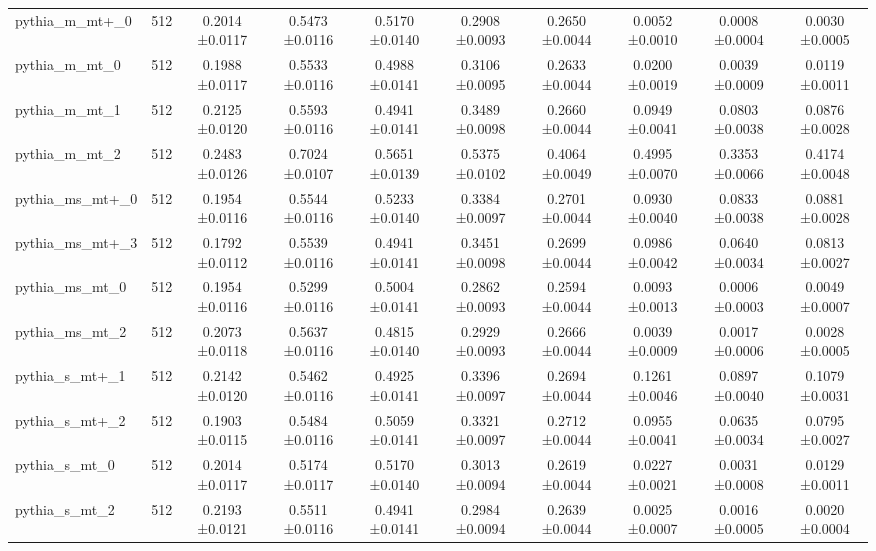 \begin{tabular}{lccccccccc}
pythia\_m\_mt+\_0 & 512 & 0.2014 ±0.0117 & 0.5473 ±0.0116 & 0.5170 ±0.0140 & 0.2908 ±0.0093 & 0.2650 ±0.0044 & 0.0052 ±0.0010 & 0.0008 ±0.0004 & 0.0030 ±0.0005 \\
pythia\_m\_mt\_0 & 512 & 0.1988 ±0.0117 & 0.5533 ±0.0116 & 0.4988 ±0.0141 & 0.3106 ±0.0095 & 0.2633 ±0.0044 & 0.0200 ±0.0019 & 0.0039 ±0.0009 & 0.0119 ±0.0011 \\
pythia\_m\_mt\_1 & 512 & 0.2125 ±0.0120 & 0.5593 ±0.0116 & 0.4941 ±0.0141 & 0.3489 ±0.0098 & 0.2660 ±0.0044 & 0.0949 ±0.0041 & 0.0803 ±0.0038 & 0.0876 ±0.0028 \\
pythia\_m\_mt\_2 & 512 & 0.2483 ±0.0126 & 0.7024 ±0.0107 & 0.5651 ±0.0139 & 0.5375 ±0.0102 & 0.4064 ±0.0049 & 0.4995 ±0.0070 & 0.3353 ±0.0066 & 0.4174 ±0.0048 \\
pythia\_ms\_mt+\_0 & 512 & 0.1954 ±0.0116 & 0.5544 ±0.0116 & 0.5233 ±0.0140 & 0.3384 ±0.0097 & 0.2701 ±0.0044 & 0.0930 ±0.0040 & 0.0833 ±0.0038 & 0.0881 ±0.0028 \\
pythia\_ms\_mt+\_3 & 512 & 0.1792 ±0.0112 & 0.5539 ±0.0116 & 0.4941 ±0.0141 & 0.3451 ±0.0098 & 0.2699 ±0.0044 & 0.0986 ±0.0042 & 0.0640 ±0.0034 & 0.0813 ±0.0027 \\
pythia\_ms\_mt\_0 & 512 & 0.1954 ±0.0116 & 0.5299 ±0.0116 & 0.5004 ±0.0141 & 0.2862 ±0.0093 & 0.2594 ±0.0044 & 0.0093 ±0.0013 & 0.0006 ±0.0003 & 0.0049 ±0.0007 \\
pythia\_ms\_mt\_2 & 512 & 0.2073 ±0.0118 & 0.5637 ±0.0116 & 0.4815 ±0.0140 & 0.2929 ±0.0093 & 0.2666 ±0.0044 & 0.0039 ±0.0009 & 0.0017 ±0.0006 & 0.0028 ±0.0005 \\
pythia\_s\_mt+\_1 & 512 & 0.2142 ±0.0120 & 0.5462 ±0.0116 & 0.4925 ±0.0141 & 0.3396 ±0.0097 & 0.2694 ±0.0044 & 0.1261 ±0.0046 & 0.0897 ±0.0040 & 0.1079 ±0.0031 \\
pythia\_s\_mt+\_2 & 512 & 0.1903 ±0.0115 & 0.5484 ±0.0116 & 0.5059 ±0.0141 & 0.3321 ±0.0097 & 0.2712 ±0.0044 & 0.0955 ±0.0041 & 0.0635 ±0.0034 & 0.0795 ±0.0027 \\
pythia\_s\_mt\_0 & 512 & 0.2014 ±0.0117 & 0.5174 ±0.0117 & 0.5170 ±0.0140 & 0.3013 ±0.0094 & 0.2619 ±0.0044 & 0.0227 ±0.0021 & 0.0031 ±0.0008 & 0.0129 ±0.0011 \\
pythia\_s\_mt\_2 & 512 & 0.2193 ±0.0121 & 0.5511 ±0.0116 & 0.4941 ±0.0141 & 0.2984 ±0.0094 & 0.2639 ±0.0044 & 0.0025 ±0.0007 & 0.0016 ±0.0005 & 0.0020 ±0.0004 \\
\bottomrule
\end{tabular}
